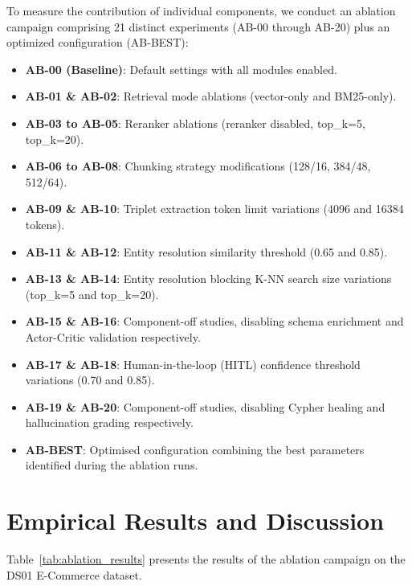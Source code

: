 To measure the contribution of individual components, we conduct an ablation campaign comprising 21 distinct experiments (AB-00 through AB-20) plus an optimized configuration (AB-BEST):
\begin{itemize}
    \item \textbf{AB-00 (Baseline)}: Default settings with all modules enabled.
    \item \textbf{AB-01 \& AB-02}: Retrieval mode ablations (vector-only and BM25-only).
    \item \textbf{AB-03 to AB-05}: Reranker ablations (reranker disabled, top\_k=5, top\_k=20).
    \item \textbf{AB-06 to AB-08}: Chunking strategy modifications (128/16, 384/48, 512/64).
    \item \textbf{AB-09 \& AB-10}: Triplet extraction token limit variations (4096 and 16384 tokens).
    \item \textbf{AB-11 \& AB-12}: Entity resolution similarity threshold (0.65 and 0.85).
    \item \textbf{AB-13 \& AB-14}: Entity resolution blocking K-NN search size variations (top\_k=5 and top\_k=20).
    \item \textbf{AB-15 \& AB-16}: Component-off studies, disabling schema enrichment and Actor-Critic validation respectively.
    \item \textbf{AB-17 \& AB-18}: Human-in-the-loop (HITL) confidence threshold variations (0.70 and 0.85).
    \item \textbf{AB-19 \& AB-20}: Component-off studies, disabling Cypher healing and hallucination grading respectively.
    \item \textbf{AB-BEST}: Optimised configuration combining the best parameters identified during the ablation runs.
\end{itemize}

\section{Empirical Results and Discussion}
\label{sec:eval:results}

Table~\ref{tab:ablation_results} presents the results of the ablation campaign on the DS01 E-Commerce dataset.

